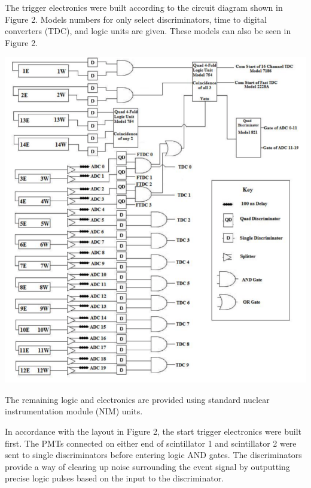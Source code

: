 \documentclass{article}
\begin{document}
The trigger electronics were built according to the circuit diagram shown in Figure 2. Models numbers for only select discriminators, time to digital converters (TDC), and logic units are given. These models can also be seen in Figure 2. 

\begin{center}

    \vspace{5mm}
    
    \includegraphics[width = \textwidth]{Figure2.png}

    
    \vspace{5mm}

\end{center}

The remaining logic and electronics are provided using standard nuclear instrumentation module (NIM) units.

In accordance with the layout in Figure 2, the start trigger electronics were built first. The PMTs connected on either end of scintillator 1 and scintillator 2 were sent to single discriminators before entering logic AND gates. The discriminators provide a way of clearing up noise surrounding the event signal by outputting precise logic pulses based on the input to the discriminator.
\end{document}
